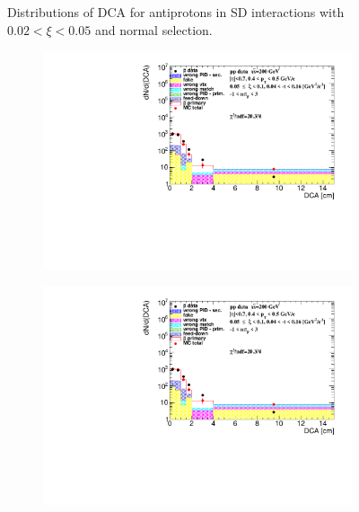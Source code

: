 \begin{figure}[h!]
\begin{subfigure}{.45\textwidth}
	\end{subfigure}
	\caption{Distributions of DCA for antiprotons in SD interactions with $0.02 < \xi<0.05$ and normal selection.}
	\label{fig:dca_proton_bar_t}
\end{figure}
\begin{figure}[h!]
	\centering
	\begin{subfigure}{.45\textwidth}
		\includegraphics[width=\linewidth, page=1]{chapters/chrgSTAR/img/DCAproton/background_p_bar_1.pdf}
	\end{subfigure}
	\begin{subfigure}{.45\textwidth}
		\includegraphics[width=\linewidth, page=2]{chapters/chrgSTAR/img/DCAproton/background_p_bar_1.pdf}
	\end{subfigure}
	\begin{subfigure}{.45\textwidth}

\end{subfigure}
\end{figure}
